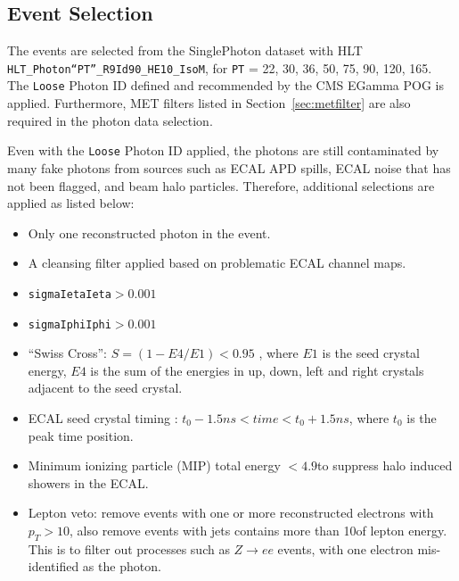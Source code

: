 \subsection{\boldmath{\gjets} Event Selection}\label{sec:bg_gjetsel}
The \gjets events are selected from the SinglePhoton dataset with HLT \texttt{HLT\_Photon``PT''\_R9Id90\_HE10\_IsoM}, for \texttt{PT} = 22, 30, 36, 50, 75, 90, 120, 165\GeV. The \texttt{Loose} Photon ID defined and recommended by the CMS EGamma POG is applied. Furthermore, MET filters listed in Section~\ref{sec:metfilter} are also required in the photon data selection.

\vspace{0.3cm}
Even with the \texttt{Loose} Photon ID applied, the photons are still contaminated by many fake photons from sources such as ECAL APD spills, ECAL noise that has not been flagged, and beam halo particles. Therefore, additional selections are applied as listed below:
\begin{itemize}
\item Only one reconstructed photon in the event. 
\item A cleansing filter applied based on problematic ECAL channel maps.
\item \texttt{sigmaIetaIeta}$>0.001$
\item \texttt{sigmaIphiIphi}$>0.001$  
\item ``Swiss Cross'':  $S = (1-E4/E1)<0.95$ , where $E1$ is the seed crystal energy, $E4$ is the sum of the energies in up, down, left and right crystals adjacent to the seed crystal.
\item ECAL seed crystal timing :   $t_0-1.5 ns < time < t_0+1.5 ns$, where $t_0$ is the peak time position. 
\item Minimum ionizing particle (MIP) total energy $< 4.9$\GeV to suppress halo induced showers in the ECAL.
\item Lepton veto: remove events with one or more reconstructed electrons with $ p_T > 10$\GeV, 
also remove events with jets contains more than 10\GeV of lepton energy.
This is to filter out processes such as $Z\to ee$ events, with one electron mis-identified as the photon. 
\end{itemize}

